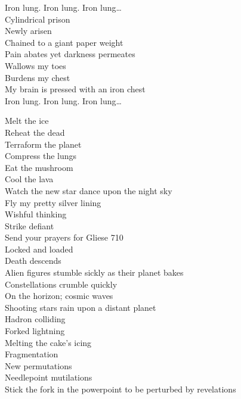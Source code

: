 Iron lung. Iron lung. Iron lung…\\

Cylindrical prison\\
Newly arisen\\
Chained to a giant paper weight\\
Pain abates yet darkness permeates\\
Wallows my toes\\
Burdens my chest\\
My brain is pressed with an iron chest\\

Iron lung. Iron lung. Iron lung…\\




Melt the ice\\
Reheat the dead\\
Terraform the planet\\
Compress the lungs\\
Eat the mushroom\\
Cool the lava\\
Watch the new star dance upon the night sky\\
Fly my pretty silver lining\\
Wishful thinking\\
Strike defiant\\
Send your prayers for Gliese 710\\
Locked and loaded\\
Death descends\\

Alien figures stumble sickly as their planet bakes\\
Constellations crumble quickly\\
On the horizon; cosmic waves\\
Shooting stars rain upon a distant planet\\
Hadron colliding\\
Forked lightning\\
Melting the cake's icing\\

Fragmentation\\
New permutations\\
Needlepoint mutilations\\
Stick the fork in the powerpoint to be perturbed by revelations\\

